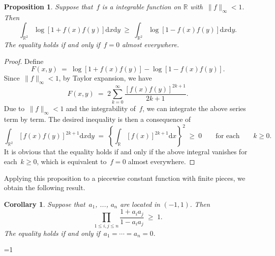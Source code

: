 \documentclass[12pt,a4paper]{article}  %
\newcommand{\bibfile}{\jobname.bib}  %
\newcommand{\iscite}{0}  %
\newtheorem{corollary}{Corollary}%
\newtheorem{proposition}{Proposition}%
\theoremstyle{definition}
\numberwithin{equation}{section}
\newcommand{\RR}{\mathbb{R}}
\newcommand{\md}{\mathrm{d}}
\begin{document}




\begin{proposition}
    \label{prop:int}
    Suppose that~$f$ is a integrable function on $\RR$ with~$\|f\|_\infty <1$. Then
    \begin{equation*}
        \int_{\RR^2} \log \left[ 1 + f(x)f(y) \right] \md x \md y
        \;\ge\; \int_{\RR^2} \log \left[ 1 - f(x)f(y) \right] \md x \md y.
    \end{equation*}
    The equality holds if and only if~$f = 0$ almost everywhere.
\end{proposition}

\begin{proof}
    Define
    \begin{equation*}
        F(x,y) \;=\; \log \left[ 1 + f(x)f(y) \right] - \log \left[ 1 - f(x)f(y) \right].
    \end{equation*}
    Since~$\|f\|_\infty < 1$,  by Taylor expansion, we have
    \begin{equation*}
        F(x,y) \;=\;  2\sum_{k=0}^\infty \frac{[f(x)f(y)]^{2k+1}}{2k+1}.
    \end{equation*}
    Due to~$\|f\|_\infty<1$ and the integrability of~$f$, we can integrate the above series term by term. The desired
    inequality is then a consequence of
    \begin{equation*}
        \int_{\RR^2}[f(x)f(y)]^{2k+1} \md x \md y \;=\; \left\{\int_{\RR}[f(x)]^{2k+1} \md x\right\}^2
        \;\ge\; 0
    \qquad\text{for each} \qquad k\ge 0.
    \end{equation*}
    It is obvious that the equality holds if and only if the above integral vanishes for each~$k \ge
    0$, which is equivalent to~$f=0$ almost everywhere.
\end{proof}

Applying this proposition to a piecewise constant function with finite pieces, we obtain the following result.

\begin{corollary}
    \label{coro:sum}
    Suppose that~$a_1$, ..., $a_n$ are located in $(-1, 1)$. Then
    \begin{equation*}
        \prod_{1\le i, j\le n} \frac{1+a_ia_j}{1-a_ia_j} \;\ge\;1.
    \end{equation*}
    The equality holds if and only if~$a_1 = \cdots = a_n = 0$.
\end{corollary}



\ifnum\iscite=1
    \small
    
    
\fi

\end{document}
